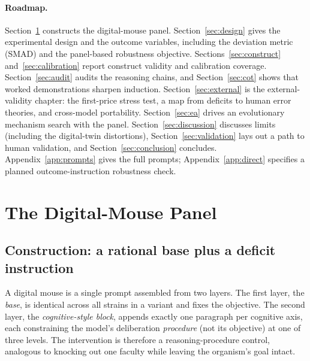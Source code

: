 \documentclass[12pt]{article}
\begin{document}
\paragraph{Roadmap.} Section~\ref{sec:panel} constructs the digital-mouse panel.
Section~\ref{sec:design} gives the experimental design and the outcome variables,
including the deviation metric (SMAD) and the panel-based robustness objective.
Sections~\ref{sec:construct} and~\ref{sec:calibration} report construct validity
and calibration coverage. Section~\ref{sec:audit} audits the reasoning chains, and
Section~\ref{sec:cot} shows that worked demonstrations sharpen induction.
Section~\ref{sec:external} is the external-validity chapter: the first-price stress
test, a map from deficits to human error theories, and cross-model portability.
Section~\ref{sec:ea} drives an evolutionary mechanism search with the panel.
Section~\ref{sec:discussion} discusses limits (including the digital-twin
distortions), Section~\ref{sec:validation} lays out a path to human validation, and
Section~\ref{sec:conclusion} concludes. Appendix~\ref{app:prompts} gives the full
prompts; Appendix~\ref{app:direct} specifies a planned outcome-instruction
robustness check.

\section{The Digital-Mouse Panel}
\label{sec:panel}

\subsection{Construction: a rational base plus a deficit instruction}

A digital mouse is a single prompt assembled from two layers. The first layer, the
\emph{base}, is identical across all strains in a variant and fixes the objective.
The second layer, the \emph{cognitive-style block}, appends exactly one paragraph
per cognitive axis, each constraining the model's deliberation \emph{procedure}
(not its objective) at one of three levels. The intervention is therefore a
reasoning-procedure control, analogous to knocking out one faculty while leaving
the organism's goal intact.
\end{document}
